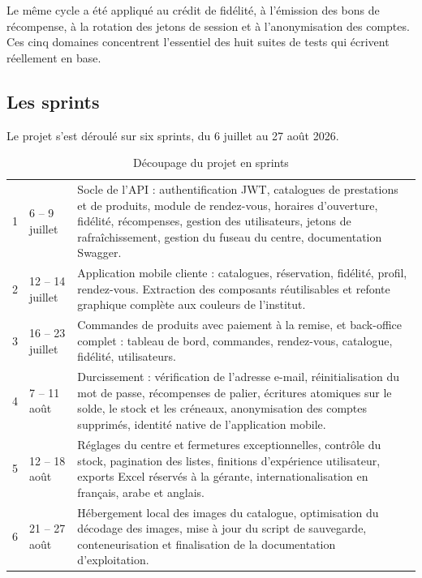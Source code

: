 Le même cycle a été appliqué au crédit de fidélité, à l'émission des bons de
récompense, à la rotation des jetons de session et à l'anonymisation des
comptes. Ces cinq domaines concentrent l'essentiel des huit suites de tests
qui écrivent réellement en base.

\subsection{Les sprints}

Le projet s'est déroulé sur six sprints, du 6 juillet au 27 août 2026.

\begin{table}[H]
\centering
\caption{Découpage du projet en sprints}
\label{tab:sprints}
\begin{tabularx}{\textwidth}{L{1.5cm} L{2.9cm} X}
\toprule
{} &  &  \\
 & 6 -- 9 juillet &
Socle de l'API : authentification JWT, catalogues de prestations et de
produits, module de rendez-vous, horaires d'ouverture, fidélité, récompenses,
gestion des utilisateurs, jetons de rafraîchissement, gestion du fuseau du
centre, documentation Swagger. \\

2 & 12 -- 14 juillet &
Application mobile cliente : catalogues, réservation, fidélité, profil,
rendez-vous. Extraction des composants réutilisables et refonte graphique
complète aux couleurs de l'institut. \\

3 & 16 -- 23 juillet &
Commandes de produits avec paiement à la remise, et back-office complet :
tableau de bord, commandes, rendez-vous, catalogue, fidélité, utilisateurs. \\

4 & 7 -- 11 août &
Durcissement : vérification de l'adresse e-mail, réinitialisation du mot de
passe, récompenses de palier, écritures atomiques sur le solde, le stock et
les créneaux, anonymisation des comptes supprimés, identité native de
l'application mobile. \\

5 & 12 -- 18 août &
Réglages du centre et fermetures exceptionnelles, contrôle du stock,
pagination des listes, finitions d'expérience utilisateur, exports Excel
réservés à la gérante, internationalisation en français, arabe et anglais. \\

6 & 21 -- 27 août &
Hébergement local des images du catalogue, optimisation du décodage des
images, mise à jour du script de sauvegarde, conteneurisation et finalisation
de la documentation d'exploitation. \\
\bottomrule
\end{tabularx}
\end{table}

